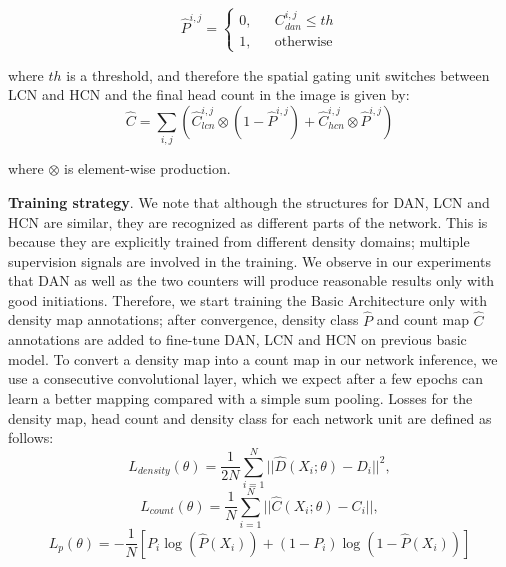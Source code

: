 \documentclass[journal]{IEEEtran}
\begin{document}
\begin{equation}
\hat P^{i,j}=\left\{
\begin{aligned}
0,&& C_{dan}^{i,j}\leq th \\
1,&& \text{otherwise}
\end{aligned}
\right.
\end{equation}

\noindent where $th$ is a threshold, and therefore the spatial gating unit switches between LCN and HCN and the final head count in the image is given by:
\begin{equation}
\hat C = \sum_{i,j} (\hat C_{lcn}^{i,j} \otimes (1 - \hat P^{i,j}) + \hat C_{hcn}^{i,j}\otimes \hat P^{i,j})
\end{equation}

\noindent where $\otimes$ is element-wise production.

\vspace{0.05in}\noindent \textbf{Training strategy}.
We note that although the structures for DAN, LCN and HCN are similar, they are recognized as different parts of the network. This is because they are explicitly trained from different density domains; multiple supervision signals are involved in the training. We observe in our experiments that DAN as well as the two counters will produce reasonable results only with good initiations. Therefore, we start training the Basic Architecture only with density map annotations; after convergence, density class $\hat P$ and count map $\hat C$ annotations are added to fine-tune DAN, LCN and HCN on previous basic model. To convert a density map into a count map in our network inference, we use a consecutive convolutional layer, which we expect after a few epochs can learn a better mapping compared with a simple sum pooling. Losses for the density map, head count and density class for each network unit are defined as follows:
\begin{equation}
  L_{density}(\theta) = \frac{1}{2N} \sum_{i=1}^{N} || \hat D(X_i;\theta) - D_i ||^2\label{densloss},
\end{equation}
\vspace{-0.05in}
\begin{equation}
  L_{count}(\theta) = \frac{1}{N} \sum_{i=1}^{N} ||\hat C(X_i;\theta) - C_i ||\label{countloss},
\end{equation}
\vspace{-0.05in}
\begin{equation}
  L_{p}(\theta) = - \frac{1}{N}[P_i\log(\hat P(X_i)) + (1 - P_i)\log(1 - \hat P(X_i))]\label{clsloss}
\end{equation}
\end{document}
